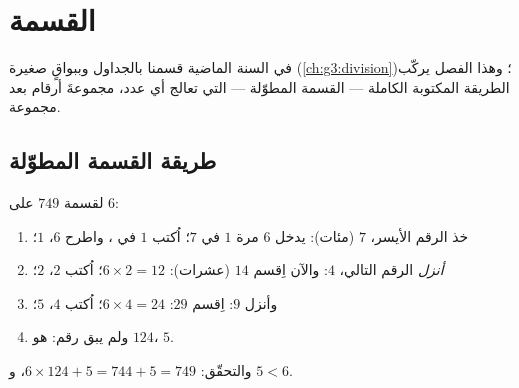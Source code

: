 \chapter{القسمة}\label{ch:g4:division}

في السنة الماضية قسمنا بالجداول وببواقٍ صغيرة
(\cref{ch:g3:division})؛ وهذا الفصل يركّب الطريقة المكتوبة
الكاملة --- القسمة المطوّلة --- التي تعالج أي عدد، مجموعةَ أرقام
بعد مجموعة.

\section{طريقة القسمة المطوّلة}

\begin{method}\label{met:g4:division:method}
لقسمة $749$ على $6$:
\begin{enumerate}
  \item خذ الرقم الأيسر، $7$ (مئات): يدخل $6$ مرة $1$ في $7$؛
        اُكتب $1$ في ، واطرح
        $6$،  $1$؛
  \item \emph{أنزل} الرقم التالي، $4$: والآن اِقسم $14$
        (عشرات): $6 \times 2 = 12$؛ اُكتب $2$،  $2$؛
  \item وأنزل $9$: اِقسم $29$: $6 \times 4 = 24$؛ اُكتب
        $4$،  $5$؛
  \item ولم يبق رقم:  هو $124$،  $5$.
\end{enumerate}
والتحقّق: $6 \times 124 + 5 = 744 + 5 = 749$، و $5 < 6$.
\end{method}

